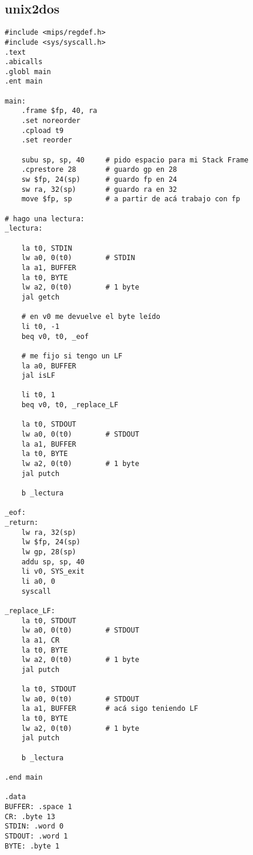 \documentclass[a4paper,11pt]{article}
\begin{document}
\subsection{unix2dos}
\begin{verbatim}
#include <mips/regdef.h>
#include <sys/syscall.h>
.text
.abicalls
.globl main
.ent main

main:
	.frame $fp, 40, ra
	.set noreorder
	.cpload t9
	.set reorder

	subu sp, sp, 40 	# pido espacio para mi Stack Frame
	.cprestore 28		# guardo gp en 28
	sw $fp, 24(sp)		# guardo fp en 24
	sw ra, 32(sp)		# guardo ra en 32
	move $fp, sp		# a partir de acá trabajo con fp

# hago una lectura:
_lectura:

	la t0, STDIN
	lw a0, 0(t0)		# STDIN
	la a1, BUFFER
	la t0, BYTE
	lw a2, 0(t0)		# 1 byte
	jal getch

	# en v0 me devuelve el byte leído
	li t0, -1
	beq v0, t0, _eof

	# me fijo si tengo un LF
	la a0, BUFFER
	jal isLF

	li t0, 1
	beq v0, t0, _replace_LF

	la t0, STDOUT
	lw a0, 0(t0)		# STDOUT
	la a1, BUFFER		
	la t0, BYTE
	lw a2, 0(t0)		# 1 byte
	jal putch

	b _lectura

_eof:
_return:
	lw ra, 32(sp)
	lw $fp, 24(sp)
	lw gp, 28(sp)
	addu sp, sp, 40
	li v0, SYS_exit
	li a0, 0
	syscall

_replace_LF:
	la t0, STDOUT
	lw a0, 0(t0)		# STDOUT
	la a1, CR			
	la t0, BYTE
	lw a2, 0(t0)		# 1 byte
	jal putch

	la t0, STDOUT
	lw a0, 0(t0)		# STDOUT
	la a1, BUFFER		# acá sigo teniendo LF
	la t0, BYTE
	lw a2, 0(t0)		# 1 byte
	jal putch

	b _lectura

.end main

.data 
BUFFER: .space 1
CR: .byte 13
STDIN: .word 0
STDOUT: .word 1
BYTE: .byte 1
\end{verbatim}
\end{document}
